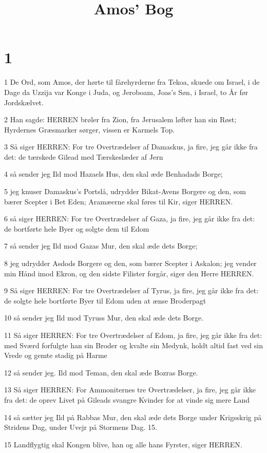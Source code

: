 

\title{Amos' Bog}


\chapter{1}

\par 1 De Ord, som Amos, der hørte til fårehyrderne fra Tekoa, skuede om Israel, i de Dage da Uzzija var Konge i Juda, og Jeroboam, Joas's Søn, i Israel, to År før Jordskælvet.
\par 2 Han sagde: HERREN brøler fra Zion, fra Jerusalem løfter han sin Røst; Hyrdernes Græsmarker sørger, vissen er Karmels Top.
\par 3 Så siger HERREN: For tre Overtrædelser af Damaskus, ja fire, jeg går ikke fra det: de tærskede Gilead med Tærskeslæder af Jern
\par 4 så sender jeg Ild mod Hazaels Hus, den skal æde Benhadads Borge;
\par 5 jeg knuser Damaskus's Portslå, udrydder Bikat-Avens Borgere og den, som bærer Scepter i Bet Eden; Aramæerne skal føres til Kir, siger HERREN.
\par 6 så siger HERREN: For tre Overtrædelser af Gaza, ja fire, jeg går ikke fra det: de bortførte hele Byer og solgte dem til Edom
\par 7 så sender jeg Ild mod Gazas Mur, den skal æde dets Borge;
\par 8 jeg udrydder Asdods Borgere og den, som bærer Scepter i Askalon; jeg vender min Hånd imod Ekron, og den sidste Filister forgår, siger den Herre HERREN.
\par 9 Så siger HERREN: For tre Overtrædelser af Tyrus, ja fire, jeg går ikke fra det: de solgte hele bortførte Byer til Edom uden at ænse Broderpagt
\par 10 så sender jeg Ild mod Tyruss Mur, den skal æde dets Borge.
\par 11 Så siger HERREN: For tre Overtrædelser af Edom, ja fire, jeg går ikke fra det: med Sværd forfulgte han sin Broder og kvalte sin Medynk, holdt altid fast ved sin Vrede og gemte stadig på Harme
\par 12 så sender jeg. Ild mod Teman, den skal æde Bozras Borge.
\par 13 Så siger HERREN: For Ammoniternes tre Overtrædelser, ja fire, jeg går ikke fra det: de oprev Livet på Gileads svangre Kvinder for at vinde sig mere Land
\par 14 så sætter jeg Ild på Rabbas Mur, den skal æde dets Borge under Krigsskrig på Stridens Dag, under Uvejr på Stormens Dag. 15.
\par 15 Landflygtig skal Kongen blive, han og alle hans Fyrster, siger HERREN.

